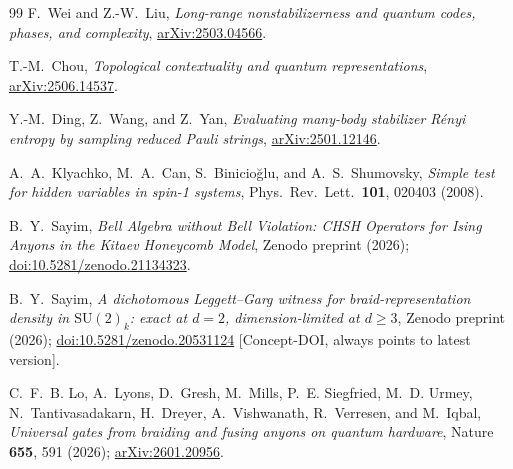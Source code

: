 \documentclass[aps,pra,twocolumn,superscriptaddress,longbibliography,floatfix,nofootinbib]{revtex4-2}
\begin{document}
\begin{thebibliography}{99}
F.~Wei and Z.-W.~Liu,
\emph{Long-range nonstabilizerness and quantum codes, phases, and
complexity},
\href{https://arxiv.org/abs/2503.04566}{arXiv:2503.04566}.

T.-M.~Chou,
\emph{Topological contextuality and quantum representations},
\href{https://arxiv.org/abs/2506.14537}{arXiv:2506.14537}.

Y.-M.~Ding, Z.~Wang, and Z.~Yan,
\emph{Evaluating many-body stabilizer Rényi entropy by sampling
reduced Pauli strings},
\href{https://arxiv.org/abs/2501.12146}{arXiv:2501.12146}.

A.~A.~Klyachko, M.~A.~Can, S.~Binicio\u{g}lu, and A.~S.~Shumovsky,
\emph{Simple test for hidden variables in spin-1 systems},
Phys.\ Rev.\ Lett.\ \textbf{101}, 020403 (2008).

B.~Y.~Sayim,
\emph{Bell Algebra without Bell Violation: CHSH Operators for Ising
Anyons in the Kitaev Honeycomb Model},
Zenodo preprint (2026);
\href{https://doi.org/10.5281/zenodo.21134323}{doi:10.5281/zenodo.21134323}.

B.~Y.~Sayim,
\emph{A dichotomous Leggett--Garg witness for braid-representation
density in $\mathrm{SU}(2)_k$: exact at $d=2$, dimension-limited at
$d\ge3$},
Zenodo preprint (2026);
\href{https://doi.org/10.5281/zenodo.20531124}{doi:10.5281/zenodo.20531124}
[Concept-DOI, always points to latest version].

C.~F.~B. Lo, A.~Lyons, D.~Gresh, M.~Mills, P.~E. Siegfried, M.~D. Urmey,
N.~Tantivasadakarn, H.~Dreyer, A.~Vishwanath, R.~Verresen, and M.~Iqbal,
\emph{Universal gates from braiding and fusing anyons on quantum
hardware},
Nature \textbf{655}, 591 (2026);
\href{https://arxiv.org/abs/2601.20956}{arXiv:2601.20956}.

\end{thebibliography}
\end{document}
